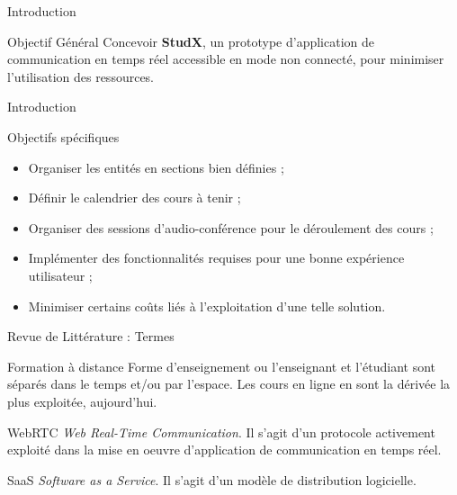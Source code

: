 \documentclass{beamer}
\begin{document}
\begin{frame}{Introduction}
  \begin{block}{Objectif Général}
    Concevoir \textbf{StudX}, un prototype d'application de communication en temps réel accessible en mode non connecté, pour minimiser l'utilisation des ressources.
  \end{block}
\end{frame}

\begin{frame}{Introduction}
  \begin{block}{Objectifs spécifiques}
    \begin{itemize}
      \item Organiser les entités en sections bien définies ;
      \item Définir le calendrier des cours à tenir ;
      \item Organiser des sessions d’audio-conférence pour le déroulement des cours ;
      \item Implémenter des fonctionnalités requises pour une bonne expérience utilisateur ;
      \item Minimiser certains coûts liés à l'exploitation d'une telle solution.
    \end{itemize}
  \end{block}
\end{frame}

\begin{frame}{Revue de Littérature : \small{Termes}}
  \begin{block}{Formation à distance}
    Forme d’enseignement ou l’enseignant et l’étudiant sont séparés dans le temps et/ou par l’espace.
    Les cours en ligne en sont la dérivée la plus exploitée, aujourd'hui.
  \end{block}
  \begin{block}{WebRTC}
    \textit{Web Real-Time Communication}. Il s'agit d'un protocole activement exploité dans la mise en oeuvre
    d'application de communication en temps réel.
  \end{block}
  \begin{block}{SaaS}
    \textit{Software as a Service}. Il s'agit d'un modèle de distribution logicielle.
  \end{block}
\end{frame}
\end{document}
